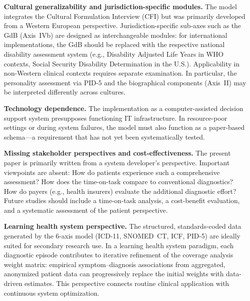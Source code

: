 \documentclass[11pt,a4paper]{article}
\begin{document}
\textbf{Cultural generalizability and jurisdiction-specific modules.} The model integrates the Cultural Formulation Interview (CFI) but was primarily developed from a Western European perspective. Jurisdiction-specific sub-axes such as the GdB (Axis~IVb) are designed as interchangeable modules: for international implementations, the GdB should be replaced with the respective national disability assessment system (e.g., Disability Adjusted Life Years in WHO contexts, Social Security Disability Determination in the U.S.). Applicability in non-Western clinical contexts requires separate examination. In particular, the personality assessment via PID-5 and the biographical components (Axis~II) may be interpreted differently across cultures.

\textbf{Technology dependence.} The implementation as a computer-assisted decision support system presupposes functioning IT infrastructure. In resource-poor settings or during system failures, the model must also function as a paper-based schema---a requirement that has not yet been systematically tested.

\textbf{Missing stakeholder perspectives and cost-effectiveness.} The present paper is primarily written from a system developer's perspective. Important viewpoints are absent: How do patients experience such a comprehensive assessment? How does the time-on-task compare to conventional diagnostics? How do payers (e.g., health insurers) evaluate the additional diagnostic effort? Future studies should include a time-on-task analysis, a cost-benefit evaluation, and a systematic assessment of the patient perspective.

\textbf{Learning health system perspective.} The structured, standards-coded data generated by the 6-axis model (ICD-11, SNOMED~CT, ICF, PID-5) are ideally suited for secondary research use. In a learning health system paradigm, each diagnostic episode contributes to iterative refinement of the coverage analysis weight matrix: empirical symptom--diagnosis associations from aggregated, anonymized patient data can progressively replace the initial weights with data-driven estimates. This perspective connects routine clinical application with continuous system optimization.
\end{document}
